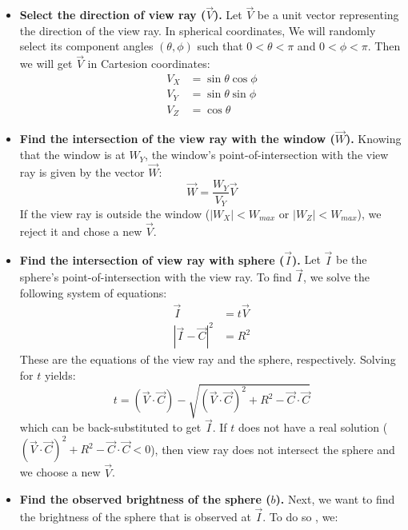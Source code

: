 \documentclass{article}
\begin{document}
\begin{itemize}

  \item \textbf{Select the direction of view ray ($\vec V$).} Let $\vec V$ be a
    unit vector representing the direction of the view ray.  In spherical
    coordinates, We will randomly select its component angles $\left(\theta,
    \phi\right)$ such that $0 < \theta < \pi$ and $0 < \phi < \pi$.  Then we
    will get $\vec V$ in Cartesion coordinates:
    \begin{align*}
      V_X &= \sin \theta \cos \phi \\
      V_Y &= \sin \theta \sin \phi \\
      V_Z &= \cos \theta
    \end{align*}

  \item \textbf{Find the intersection of the view ray with the window ($\vec
    W$).} Knowing that the window is at $W_Y$, the window's point-of-intersection with
    the view ray is given by the vector $\vec W$:
    $$ \vec W = \frac{W_Y}{V_Y} \vec V $$
    If the view ray is outside the window ($\left|W_X\right| <  W_{max}$ or
    $\left|W_Z\right| < W_{max}$), we reject it and chose a new $\vec V$.


  \item \textbf{Find the intersection of view ray with sphere ($\vec I$).}  Let
    $\vec I$ be the sphere's point-of-intersection with the view ray.  To find
    $\vec I$, we solve the following system of equations:
    \begin{align*}
      \vec I &= t \vec V \\
      \left| \vec I - \vec C \right|^2 &= R^2
    \end{align*}
    These are the equations of the view ray and the sphere, respectively.
    Solving for $t$ yields:
    $$ t = \left(\vec V \cdot \vec C \right) -
    \sqrt{\left(\vec V \cdot \vec C \right)^2 + R^2 - \vec C \cdot \vec C} $$
    which can be back-substituted to get $\vec I$.  If $t$ does not have a real
    solution ($(\vec V \cdot \vec C )^2 + R^2 - \vec C \cdot \vec C < 0$), then
    view ray does not intersect the sphere and we choose a new $\vec V$.

  \item \textbf{Find the observed brightness of the sphere ($b$).}  Next, we want to
    find the brightness of the sphere that is observed at $\vec I$.  To do so , we:

    \begin{itemize}


\end{itemize}
\end{itemize}
\end{document}
